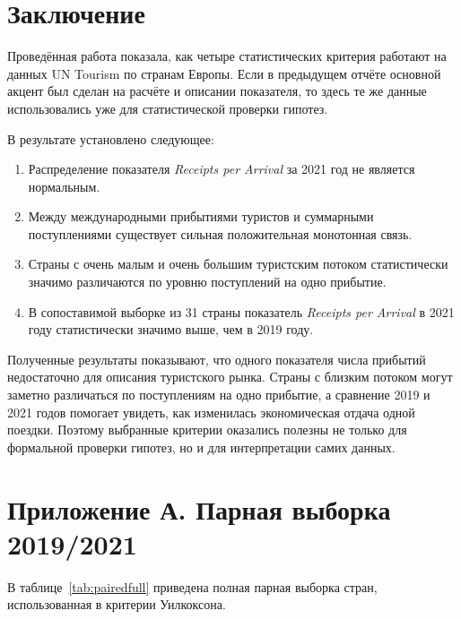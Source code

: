 \documentclass[14pt,a4paper]{extarticle}
\begin{document}
\clearpage
{}
\section*{Заключение}

Проведённая работа показала, как четыре статистических критерия работают на данных UN Tourism по странам Европы. Если в предыдущем отчёте основной акцент был сделан на расчёте и описании показателя, то здесь те же данные использовались уже для статистической проверки гипотез.

В результате установлено следующее:
\begin{enumerate}[leftmargin=1.25cm]
    \item Распределение показателя \textit{Receipts per Arrival} за 2021 год не является нормальным.
    \item Между международными прибытиями туристов и суммарными поступлениями существует сильная положительная монотонная связь.
    \item Страны с очень малым и очень большим туристским потоком статистически значимо различаются по уровню поступлений на одно прибытие.
    \item В сопоставимой выборке из 31 страны показатель \textit{Receipts per Arrival} в 2021 году статистически значимо выше, чем в 2019 году.
\end{enumerate}

Полученные результаты показывают, что одного показателя числа прибытий недостаточно для описания туристского рынка. Страны с близким потоком могут заметно различаться по поступлениям на одно прибытие, а сравнение 2019 и 2021 годов помогает увидеть, как изменилась экономическая отдача одной поездки. Поэтому выбранные критерии оказались полезны не только для формальной проверки гипотез, но и для интерпретации самих данных.

\clearpage
{}
\section*{Приложение А. Парная выборка 2019/2021}

В таблице~\ref{tab:pairedfull} приведена полная парная выборка стран, использованная в критерии Уилкоксона.
\end{document}
